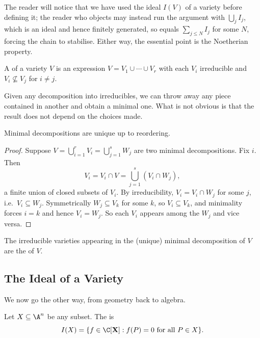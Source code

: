 The reader will notice that we have used the ideal $I(V)$ of a variety before defining it; the reader who objects may instead run the argument with $\bigcup_j I_j$, which is an ideal and hence finitely generated, so equals $\sum_{j \leq N} I_j$ for some $N$, forcing the chain to stabilise. Either way, the essential point is the Noetherian property.

\begin{definition}
	A  of a variety $V$ is an expression $V = V_1 \cup \cdots \cup V_r$ with each $V_i$ irreducible and $V_i \not\subseteq V_j$ for $i \neq j$.
\end{definition}

Given any decomposition into irreducibles, we can throw away any piece contained in another and obtain a minimal one. What is not obvious is that the result does not depend on the choices made.

\begin{proposition}
	Minimal decompositions are unique up to reordering.
\end{proposition}

\begin{proof}
	Suppose $V = \bigcup_{i=1}^r V_i = \bigcup_{j=1}^s W_j$ are two minimal decompositions. Fix $i$. Then
	$$V_i = V_i \cap V = \bigcup_{j=1}^s (V_i \cap W_j),$$
	a finite union of closed subsets of $V_i$. By irreducibility, $V_i = V_i \cap W_j$ for some $j$, i.e.\ $V_i \subseteq W_j$. Symmetrically $W_j \subseteq V_k$ for some $k$, so $V_i \subseteq V_k$, and minimality forces $i = k$ and hence $V_i = W_j$. So each $V_i$ appears among the $W_j$ and vice versa.
\end{proof}

\begin{definition}
	The irreducible varieties appearing in the (unique) minimal decomposition of $V$ are the  of $V$.
\end{definition}

\subsection{The Ideal of a Variety}\label{subsec:ideals}

We now go the other way, from geometry back to algebra.

\begin{definition}
	Let $X \subseteq \A^n$ be any subset. The  is
	$$I(X) = \{f \in \C[\mathbf{X}] : f(P) = 0 \text{ for all } P \in X\}.$$
\end{definition}

